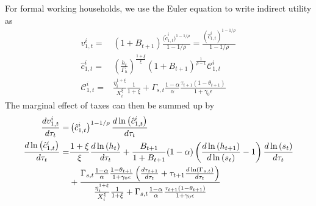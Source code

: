 For formal working households, we use the Euler equation to write indirect utility as
\begin{align*}
    v_{1,t}^i =& (1+B_{t+1})\frac{\Big(\tilde{c}_{1,t}^i\Big)^{1-1/\rho}}{1-1/\rho} = \frac{\left(\hat{c}_{1,t}^i\right)^{1-1/\rho}}{1-1/\rho} \\
    \hat{c}_{1,t}^i =& \left(\frac{h_t}{\Gamma_h}\right)^{\frac{1+\xi}{\xi}}(1+B_{t+1})^{\frac{1}{\rho-1}}\mathcal{C}_{1,t}^i \\ 
    \mathcal{C}_{1,t}^i =& \frac{\eta_i^{1+\xi}}{X_i^{\xi}}\frac{1}{1+\xi}+\Gamma_{s,t}\frac{1-\alpha}{\alpha}\frac{\tau_{t+1}(1-\theta_{t+1})}{1+\gamma_0\epsilon}
\end{align*}
The marginal effect of taxes can then be summed up by
\begin{align}
    \frac{dv_{1,t}^i}{d\tau_t}=& \left(\hat{c}_{1,t}^i\right)^{1-1/\rho} \frac{d\ln\left(\hat{c}_{1,t}^i\right)}{d\tau_t} \\
    \frac{d\ln\left(\hat{c}_{1,t}^i\right)}{d\tau_t} =& \frac{1+\xi}{\xi}\dfrac{d\ln\left(h_t\right)}{d\tau_t}+\frac{B_{t+1}}{1+B_{t+1}}(1-\alpha)\left(\frac{d\ln\left(h_{t+1}\right)}{d\ln\left(s_t\right)}-1\right)\frac{d\ln\left(s_t\right)}{d\tau_t} \notag\\
    &+\frac{\Gamma_{s,t}\frac{1-\alpha}{\alpha}\frac{1-\theta_{t+1}}{1+\gamma_0\epsilon}\left(\frac{d\tau_{t+1}}{d\tau_t}+\tau_{t+1}\frac{d\ln\left(\Gamma_{s,t}\right)}{d\tau_t}\right)}{\frac{\eta_i^{1+\xi}}{X_i^{\xi}}\frac{1}{1+\xi}+\Gamma_{s,t}\frac{1-\alpha}{\alpha}\frac{\tau_{t+1}(1-\theta_{t+1})}{1+\gamma_0\epsilon}} 
\end{align}


